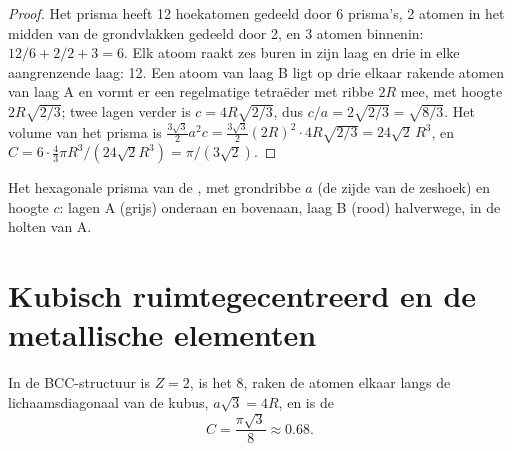 \begin{proof}
Het prisma heeft 12 hoekatomen gedeeld door 6 prisma's, 2 atomen in het
midden van de grondvlakken gedeeld door 2, en 3 atomen binnenin:
$12/6 + 2/2 + 3 = 6$. Elk atoom raakt zes buren in zijn laag en drie in
elke aangrenzende laag: 12. Een atoom van laag B ligt op drie elkaar
rakende atomen van laag A en vormt er een regelmatige tetraëder met ribbe
$2R$ mee, met hoogte $2R\sqrt{2/3}$; twee lagen verder is
$c = 4R\sqrt{2/3}$, dus $c/a = 2\sqrt{2/3} = \sqrt{8/3}$. Het volume van
het prisma is $\frac{3\sqrt3}{2}a^2 c = \frac{3\sqrt3}{2}(2R)^2 \cdot
4R\sqrt{2/3} = 24\sqrt2\,R^3$, en $C = 6 \cdot \frac43\pi R^3/(24\sqrt2
R^3) = \pi/(3\sqrt2)$.
\end{proof}

\begin{omfigure}

{\small Het hexagonale prisma van de , met grondribbe
$a$ (de zijde van de zeshoek) en hoogte $c$: lagen A (grijs) onderaan en
bovenaan, laag B (rood) halverwege, in de holten van A.}
\end{omfigure}

\section{Kubisch ruimtegecentreerd en de metallische elementen}

\begin{proposition}\label{prop:b1:crystals-metals:bcc}
In de BCC-structuur is $Z = 2$, is het  8, raken de
atomen elkaar langs de lichaamsdiagonaal van de kubus, $a\sqrt3 = 4R$, en
is de 
\[
  C = \frac{\pi\sqrt3}{8} \approx 0.68 .
\]
\end{proposition}


